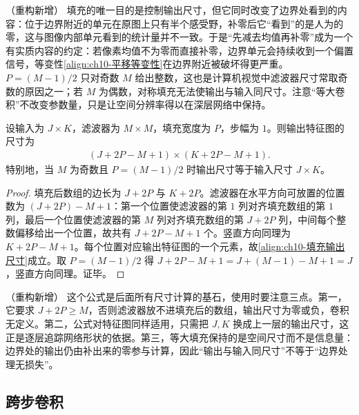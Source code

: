 \documentclass[../../main.tex]{subfiles}
\begin{document}
\begin{remark}（重构新增）
填充的唯一目的是控制输出尺寸，但它同时改变了边界处看到的内容：位于边界附近的单元在原图上只有半个感受野，补零后它“看到”的是人为的零，这与图像内部单元看到的统计量并不一致。于是“先减去均值再补零”成为一个有实质内容的约定：若像素均值不为零而直接补零，边界单元会持续收到一个偏置信号，等变性\eqref{align:ch10-平移等变性}在边界附近被破坏得更严重。$P=(M-1)/2$ 只对奇数 $M$ 给出整数，这也是计算机视觉中滤波器尺寸常取奇数的原因之一；若 $M$ 为偶数，对称填充无法使输出与输入同尺寸。注意“等大卷积”不改变参数量，只是让空间分辨率得以在深层网络中保持。
\end{remark}

\begin{proposition}[填充卷积的输出尺寸]\label{proposition:ch10-填充输出尺寸}
设输入为 $J\times K$，滤波器为 $M\times M$，填充宽度为 $P$，步幅为 $1$。则输出特征图的尺寸为
\begin{align}
  (J+2P-M+1)\times(K+2P-M+1).
  \label{align:ch10-填充输出尺寸}
\end{align}
特别地，当 $M$ 为奇数且 $P=(M-1)/2$ 时输出尺寸等于输入尺寸 $J\times K$。
\end{proposition}
\begin{proof}
填充后数组的边长为 $J+2P$ 与 $K+2P$。滤波器在水平方向可放置的位置数为 $(J+2P)-M+1$：第一个位置使滤波器的第 $1$ 列对齐填充数组的第 $1$ 列，最后一个位置使滤波器的第 $M$ 列对齐填充数组的第 $J+2P$ 列，中间每个整数偏移给出一个位置，故共有 $J+2P-M+1$ 个。竖直方向同理为 $K+2P-M+1$。每个位置对应输出特征图的一个元素，故\eqref{align:ch10-填充输出尺寸}成立。取 $P=(M-1)/2$ 得 $J+2P-M+1=J+(M-1)-M+1=J$，竖直方向同理。证毕。
\end{proof}

\begin{remark}（重构新增）
这个公式是后面所有尺寸计算的基石，使用时要注意三点。第一，它要求 $J+2P\geqslant M$，否则滤波器放不进填充后的数组，输出尺寸为零或负，卷积无定义。第二，公式对特征图同样适用，只需把 $J,K$ 换成上一层的输出尺寸，这正是逐层追踪网络形状的依据。第三，等大填充保持的是空间尺寸而不是信息量：边界处的输出仍由补出来的零参与计算，因此“输出与输入同尺寸”不等于“边界处理无损失”。
\end{remark}

\subsection{跨步卷积}\label{subsection:ch10-跨步卷积}
\end{document}
